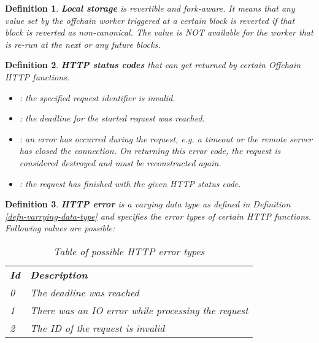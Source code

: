 \documentclass{book}
\newcommand{\tmstrong}[1]{\textbf{#1}}
\newcommand{\tmtextbf}[1]{{\bfseries{#1}}}
\newcommand{\tmtexttt}[1]{{\ttfamily{#1}}}
\newcommand{\tmverbatim}[1]{{\ttfamily{#1}}}
\newenvironment{itemizedot}{\begin{itemize} \renewcommand{\labelitemi}{$\bullet$}\renewcommand{\labelitemii}{$\bullet$}\renewcommand{\labelitemiii}{$\bullet$}\renewcommand{\labelitemiv}{$\bullet$}}{\end{itemize}}
\newtheorem{definition}{Definition}
\providecommand{\tmstrong}[1]{\tmtextbf{#1}}
\providecommand{\tmtextbf}[1]{\tmtextbf{#1}}
\providecommand{\tmverbatim}[1]{\tmtexttt{#1}}
\newtheorem{definition}{Definition}
\begin{document}
\begin{definition}
  \label{defn-local-storage}{\tmstrong{Local storage}} is revertible and
  fork-aware. It means that any value set by the offchain worker triggered at
  a certain block is reverted if that block is reverted as non-canonical. The
  value is NOT available for the worker that is re-run at the next or any
  future blocks.
\end{definition}

\begin{definition}
  \label{defn-http-status-codes}{\tmstrong{HTTP status codes}} that can get
  returned by certain Offchain HTTP functions.
  \begin{itemizedot}
    \item \tmverbatim{0}: the specified request identifier is invalid.
  \end{itemizedot}
  \begin{itemizedot}
    \item \tmverbatim{10}: the deadline for the started request was reached.
  \end{itemizedot}
  \begin{itemizedot}
    \item \tmverbatim{20}: an error has occurred during the request, e.g. a
    timeout or the remote server has closed the connection. On returning this
    error code, the request is considered destroyed and must be reconstructed
    again.
  \end{itemizedot}
  \begin{itemizedot}
    \item \tmverbatim{100-999}: the request has finished with the given HTTP
    status code.
  \end{itemizedot}
\end{definition}

\begin{definition}
  \label{defn-http-error}{\tmstrong{HTTP error}} is a varying data type as
  defined in Definition \ref{defn-varrying-data-type} and specifies the error
  types of certain HTTP functions. Following values are possible:
  
  \begin{table}[h]
    \begin{tabular}{ll}
      {\tmstrong{Id}} & {\tmstrong{Description}}\\
      0 & The deadline was reached\\
      1 & There was an IO error while processing the request\\
      2 & The ID of the request is invalid
    \end{tabular}
    \caption{Table of possible HTTP error types}
  \end{table}
\end{definition}
\end{document}
